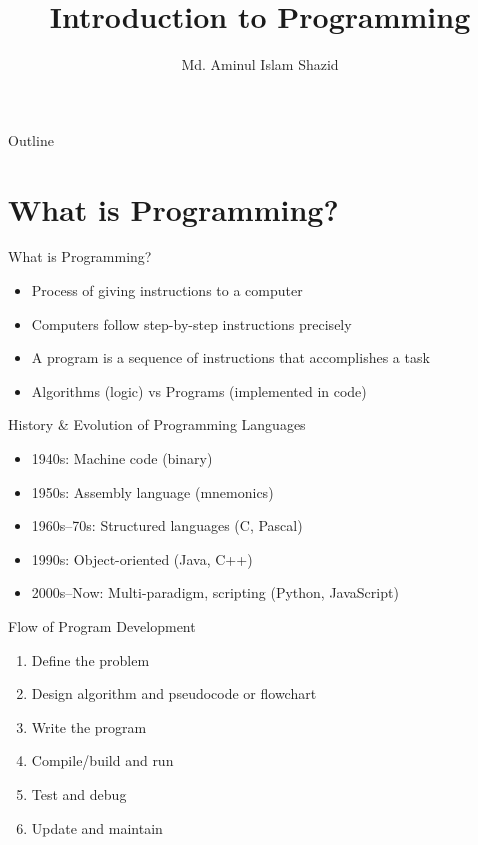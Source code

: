 \documentclass[12pt, aspectratio=169]{beamer}
\title{Introduction to Programming}
\author{Md. Aminul Islam Shazid}
\date{}
\begin{document}
    {
		\addtocounter{framenumber}{-2}    %

		\begin{frame}
			\titlepage
		\end{frame}

		\begin{frame}{Outline}
            \vfill
			\tableofcontents[subsectionstyle=hide]
            \vfill
		\end{frame}
	}


    \section{What is Programming?}

    \begin{frame}{What is Programming?}
        \begin{itemize}
            \item Process of giving instructions to a computer
            \item Computers follow step-by-step instructions precisely
            \item A program is a sequence of instructions that accomplishes a task
            \item Algorithms (logic) vs Programs (implemented in code)
        \end{itemize}
    \end{frame}


    \begin{frame}{History \& Evolution of Programming Languages}
        \begin{itemize}
            \item 1940s: Machine code (binary)
            \item 1950s: Assembly language (mnemonics)
            \item 1960s--70s: Structured languages (C, Pascal)
            \item 1990s: Object-oriented (Java, C++)
            \item 2000s--Now: Multi-paradigm, scripting (Python, JavaScript)
        \end{itemize}
    \end{frame}


    \begin{frame}{Flow of Program Development}
        \begin{enumerate}
            \item Define the problem
            \item Design algorithm and pseudocode or flowchart
            \item Write the program
            \item Compile/build and run
            \item Test and debug
            \item Update and maintain
        \end{enumerate}
    \end{frame}
\end{document}
